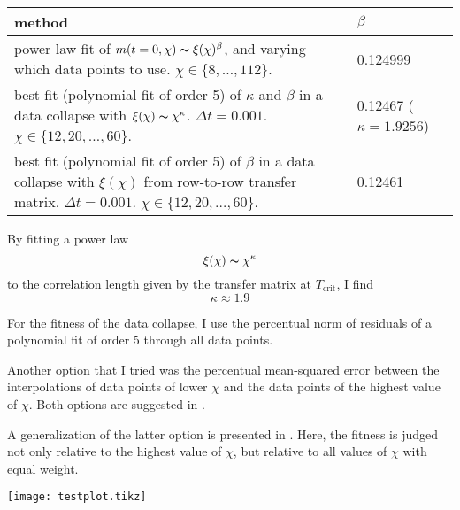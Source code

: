 \begin{center}
\begin{tabularx}{\textwidth}{ |X|X| }
  \hline
  method & $\beta$ \\
  \hline
  power law fit of $m(t = 0, \chi) \thicksim \xi(\chi)^{\beta} $, and varying which data
  points to use. $\chi \in \{8, \dots, 112 \}$. & 0.124999 \\
  \hline
  best fit (polynomial fit of order 5) of $\kappa$ and $\beta$ in a data collapse with
  $\xi(\chi) \thicksim \chi^{\kappa}$.  $\Delta t = 0.001$. $\chi \in \{12, 20, \dots, 60 \}$. &
  0.12467 ($\kappa = 1.9256$) \\
  \hline
  best fit (polynomial fit of order 5) of $\beta$ in a data collapse with $\xi(\chi)$ from
  row-to-row transfer matrix. $\Delta t = 0.001$. $\chi \in \{ 12, 20, \dots, 60 \}$. &
  0.12461 \\
  \hline
\end{tabularx}
\end{center}

By fitting a power law
\begin{equation*}
    \xi(\chi) \thicksim \chi^{\kappa}
\end{equation*}
to the correlation length given by the transfer matrix at $T_{\text{crit}}$, I find
\begin{equation*}
    \kappa \approx 1.9
\end{equation*}

For the fitness of the data collapse, I use the percentual norm of residuals of a
polynomial fit of order 5 through all data points.

Another option that I tried was the percentual mean-squared error between the
interpolations of data points of lower $\chi$ and the data points of the highest value of
$\chi$. Both options are suggested in \cite{sandvik2010computational}.

A generalization of the latter option is presented in \cite{bhattacharjee2001measure}.
Here, the fitness is judged not only relative to the highest value of $\chi$, but relative
to all values of $\chi$ with equal weight.



\texttt{[image: testplot.tikz]}
